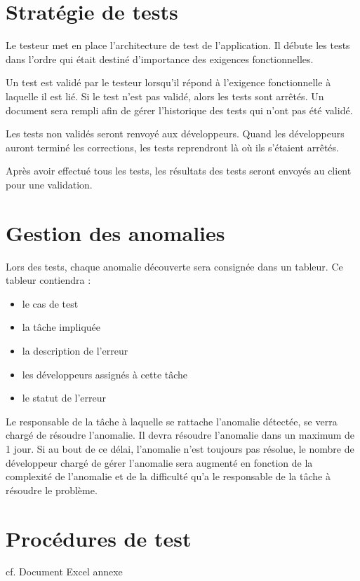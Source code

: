 \documentclass[a4paper,11pt,french]{article}
\begin{document}
\section{Stratégie de tests}
Le testeur met en place l’architecture de test de l’application. Il débute les tests dans l’ordre qui était destiné d’importance des exigences fonctionnelles. 

Un test est validé par le testeur lorsqu’il répond à l’exigence fonctionnelle à laquelle il est lié. Si le test n’est pas validé, alors les tests sont arrêtés. Un document sera rempli afin de gérer l’historique des tests qui n’ont pas été validé. 

Les tests non validés seront renvoyé aux développeurs. Quand les développeurs auront terminé les corrections, les tests reprendront là où ils s’étaient arrêtés.

Après avoir effectué tous les tests, les résultats des tests seront envoyés au client pour une validation.

\section{Gestion des anomalies}
Lors des tests, chaque anomalie découverte sera consignée dans un tableur. Ce tableur contiendra :
\begin{itemize}
\item le cas de test
\item la tâche impliquée
\item la description de l'erreur
\item les développeurs assignés à cette tâche
\item le statut de l'erreur
\end{itemize}

Le responsable de la tâche à laquelle se rattache l'anomalie détectée, se verra chargé de résoudre l'anomalie. 
Il devra résoudre l'anomalie dans un maximum de 1 jour. Si au bout de ce délai, l'anomalie n'est toujours 
pas résolue, le nombre de développeur chargé de gérer l'anomalie sera augmenté en fonction de la complexité 
de l'anomalie et de la difficulté qu'a le responsable de la tâche à résoudre le problème.
\section{Procédures de test}
cf. Document Excel annexe
\end{document}
